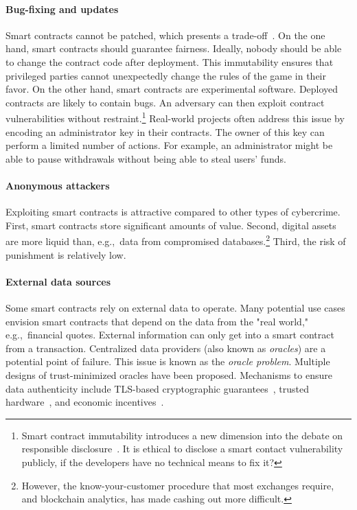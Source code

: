 \paragraph{Bug-fixing and updates}
Smart contracts cannot be patched, which presents a trade-off~\cite{Porru2017}.
On the one hand, smart contracts should guarantee fairness.
Ideally, nobody should be able to change the contract code after deployment.
This immutability ensures that privileged parties cannot unexpectedly change the rules of the game in their favor.
On the other hand, smart contracts are experimental software.
Deployed contracts are likely to contain bugs.
An adversary can then exploit contract vulnerabilities without restraint.\footnote{Smart contract immutability introduces a new dimension into the debate on responsible disclosure~\cite{Schneier2007}. It is ethical to disclose a smart contact vulnerability publicly, if the developers have no technical means to fix it?}
Real-world projects often address this issue by encoding an administrator key in their contracts.
The owner of this key can perform a limited number of actions.
For example, an administrator might be able to pause withdrawals without being able to steal users' funds.

\paragraph{Anonymous attackers}
Exploiting smart contracts is attractive compared to other types of cybercrime.
First, smart contracts store significant amounts of value.
Second, digital assets are more liquid than, e.g.,~data from compromised databases.\footnote{However, the know-your-customer procedure that most exchanges require, and blockchain analytics, has made cashing out more difficult.}
Third, the risk of punishment is relatively low.

\paragraph{External data sources}
Some smart contracts rely on external data to operate.
Many potential use cases envision smart contracts that depend on the data from the "real world," e.g.,~financial quotes.
External information can only get into a smart contract from a transaction.
Centralized data providers (also known as \textit{oracles}) are a potential point of failure.
This issue is known as the \textit{oracle problem}.
Multiple designs of trust-minimized oracles have been proposed.
Mechanisms to ensure data authenticity include TLS-based cryptographic guarantees~\cite{Provable}, trusted hardware~\cite{Zhang2016}, and economic incentives~\cite{Chainlink}.

